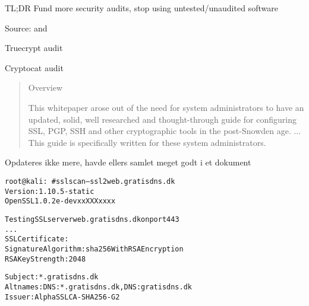 \documentclass[20pt,landscape,a4paper,footrule]{foils}
\begin{document}
\vskip 2cm

\centerline{TL;DR Fund more security audits, stop using untested/unaudited software}




Source:  and \\


\begin{list1}
\item Truecrypt audit\\
{\footnotesize{}}
\item Cryptocat audit\\
{\footnotesize{}}
\end{list1}




\begin{quote}
Overview

This whitepaper arose out of the need for system administrators to have an updated, solid, well researched and thought-through guide for configuring SSL, PGP, SSH and other cryptographic tools in the post-Snowden age. ... This guide is specifically written for these system administrators.
\end{quote}


Opdateres ikke mere, havde ellers samlet meget godt i et dokument


\begin{alltt}\small
root@kali:~# sslscan --ssl2 web.gratisdns.dk
Version: 1.10.5-static
OpenSSL 1.0.2e-dev xx XXX xxxx

Testing SSL server web.gratisdns.dk on port 443
...
  SSL Certificate:
Signature Algorithm: sha256WithRSAEncryption
RSA Key Strength:    2048

Subject:  *.gratisdns.dk
Altnames: DNS:*.gratisdns.dk, DNS:gratisdns.dk
Issuer:   AlphaSSL CA - SHA256 - G2
\end{alltt}
\end{document}
